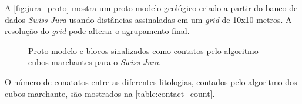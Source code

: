 A \autoref{fig:jura_proto} mostra um proto-modelo geológico criado a partir do banco de dados \textit{Swiss Jura} usando distâncias assinaladas em um \textit{grid} de 10x10 metros. A resolução do \textit{grid} pode alterar o agrupamento final.

\begin{figure}[H]
    \caption{Proto-modelo e blocos sinalizados como contatos pelo algoritmo cubos marchantes para o \textit{Swiss Jura}.} \label{fig:jura_proto}
     \centering
     \hspace{1em}
\end{figure}

O número de conatatos entre as diferentes litologias, contados pelo algoritmo dos cubos marchante, são mostrados na \autoref{table:contact_count}.

